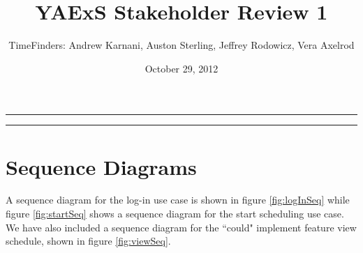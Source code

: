 \documentclass[11pt]{article}
\title{\bf YAExS Stakeholder Review 1}
\author{TimeFinders: Andrew Karnani, Auston Sterling, Jeffrey Rodowicz, Vera Axelrod}
\date{October 29, 2012}
\begin{document}
\maketitle
\hrule
\vspace{0.03in}
\hrule

\section{Sequence Diagrams} %

A sequence diagram for the log-in use case is shown in figure \ref{fig:logInSeq}
 while figure \ref{fig:startSeq} shows a sequence diagram for the start scheduling 
use case.  We have also included a sequence diagram for the ``could" implement feature view schedule, shown in figure \ref{fig:viewSeq}. 
\end{document}
